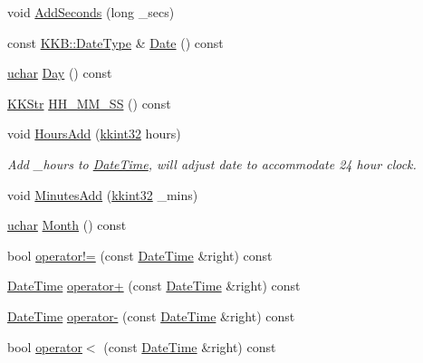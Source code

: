 \begin{DoxyCompactItemize}
\item 
void \hyperlink{class_k_k_b_1_1_date_time_a4231e149b01ab91773736995e8a5bc52}{Add\+Seconds} (long \+\_\+secs)
\item 
const \hyperlink{class_k_k_b_1_1_date_type}{K\+K\+B\+::\+Date\+Type} \& \hyperlink{class_k_k_b_1_1_date_time_ab18f4ea0ddd5df87ad52e343f68b039e}{Date} () const 
\item 
\hyperlink{namespace_k_k_b_ace9969169bf514f9ee6185186949cdf7}{uchar} \hyperlink{class_k_k_b_1_1_date_time_a4ff581d59f874c3fb7d5fc3344fba4bf}{Day} () const 
\item 
\hyperlink{class_k_k_b_1_1_k_k_str}{K\+K\+Str} \hyperlink{class_k_k_b_1_1_date_time_afb7cd42c8b3683935391f684ed866221}{H\+H\+\_\+\+M\+M\+\_\+\+SS} () const 
\item 
void \hyperlink{class_k_k_b_1_1_date_time_a922684cdbfaf29c9bc46bd932569d911}{Hours\+Add} (\hyperlink{namespace_k_k_b_a8fa4952cc84fda1de4bec1fbdd8d5b1b}{kkint32} hours)
\begin{DoxyCompactList}\small\item\em Add \+\_\+hours to \hyperlink{class_k_k_b_1_1_date_time}{Date\+Time}, will adjust date to accommodate 24 hour clock. \end{DoxyCompactList}\item 
void \hyperlink{class_k_k_b_1_1_date_time_af9c89ac57882cb38458235f5b1c42781}{Minutes\+Add} (\hyperlink{namespace_k_k_b_a8fa4952cc84fda1de4bec1fbdd8d5b1b}{kkint32} \+\_\+mins)
\item 
\hyperlink{namespace_k_k_b_ace9969169bf514f9ee6185186949cdf7}{uchar} \hyperlink{class_k_k_b_1_1_date_time_a651e406918c5d7f1905252ada51abb37}{Month} () const 
\item 
bool \hyperlink{class_k_k_b_1_1_date_time_a14c61e0102af91b8910c15070d2c33ce}{operator!=} (const \hyperlink{class_k_k_b_1_1_date_time}{Date\+Time} \&right) const 
\item 
\hyperlink{class_k_k_b_1_1_date_time}{Date\+Time} \hyperlink{class_k_k_b_1_1_date_time_a358894c10ee65b942d362ce6de71460c}{operator+} (const \hyperlink{class_k_k_b_1_1_date_time}{Date\+Time} \&right) const 
\item 
\hyperlink{class_k_k_b_1_1_date_time}{Date\+Time} \hyperlink{class_k_k_b_1_1_date_time_abdcdc4c9d9a3a7d82462cddd132cc734}{operator-\/} (const \hyperlink{class_k_k_b_1_1_date_time}{Date\+Time} \&right) const 
\item 
bool \hyperlink{class_k_k_b_1_1_date_time_a76b9346b8f98fbaea671dd1892cffa7f}{operator$<$} (const \hyperlink{class_k_k_b_1_1_date_time}{Date\+Time} \&right) const 

\end{DoxyCompactItemize}
